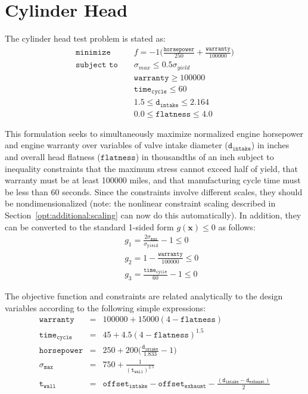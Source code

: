 \section{Cylinder Head}\label{additional:cylinder}

The cylinder head test problem is stated as:
\begin{eqnarray}
\texttt{minimize }   & & f=-1\bigg(\frac{\mathtt{horsepower}}{250}+
  \frac{\mathtt{warranty}}{100000}\bigg) \nonumber\\
\texttt{subject to } & & \sigma_{max} \leq 0.5 \sigma_{yield}
  \label{additional:cylhead}\\
                     & & \mathtt{warranty} \geq 100000          \nonumber\\
                     & & \mathtt{time_{cycle}} \leq 60          \nonumber\\
                     & & 1.5 \leq \mathtt{d_{intake}} \leq 2.164\nonumber\\
                     & & 0.0 \leq \mathtt{flatness} \leq 4.0    \nonumber
\end{eqnarray}

This formulation seeks to simultaneously maximize normalized engine
horsepower and engine warranty over variables of valve intake diameter
($\mathtt{d_{intake}}$) in inches and overall head flatness
($\mathtt{flatness}$) in thousandths of an inch subject to inequality
constraints that the maximum stress cannot exceed half of yield, that
warranty must be at least 100000 miles, and that manufacturing cycle
time must be less than 60 seconds. Since the constraints involve
different scales, they should be nondimensionalized (note: the
nonlinear constraint scaling described in
Section~\ref{opt:additional:scaling} can now do this
automatically). In addition, they can be converted to the standard
1-sided form $g(\mathbf{x}) \leq 0$ as follows:
\begin{eqnarray}
  & & g_1=\frac{2\sigma_{\mathtt{max}}}{\sigma_{\mathtt{yield}}}-1 \leq 0
  \nonumber\\
  & & g_2=1-\frac{\mathtt{warranty}}{100000} \leq 0
  \label{additional:cylheadaltg}\\
  & & g_3=\frac{\mathtt{time_{cycle}}}{60}-1 \leq 0\nonumber
\end{eqnarray}

The objective function and constraints are related analytically to the
design variables according to the following simple expressions:
\begin{eqnarray}
\mathtt{warranty}     &=& 100000+15000(4-\mathtt{flatness})\nonumber\\
\mathtt{time_{cycle}} &=& 45+4.5(4-\mathtt{flatness})^{1.5}\nonumber\\
\mathtt{horsepower}   &=& 250+200\bigg(\frac{\mathtt{d_{intake}}}{1.833}-1\bigg)
  \label{additional:cylheadexp}\\
\sigma_{\mathtt{max}} &=& 750+\frac{1}{(\mathtt{t_{wall}})^{2.5}}\nonumber\\
\mathtt{t_{wall}}     &=& \mathtt{offset_{intake}-offset_{exhaust}}-
  \frac{(\mathtt{d_{intake}-d_{exhaust}})}{2}\nonumber
\end{eqnarray}

